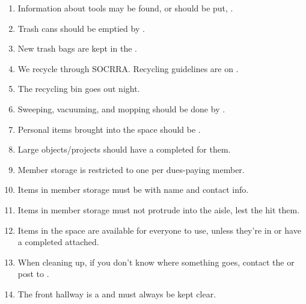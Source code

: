\documentclass[10pt,letterpaper]{article}
\begin{document}
\begin{Form}
\begin{enumerate}
            \item Information about tools may be found, or should be put, \TextField[name=D1,width=2.5cm,bordercolor=black]{\mbox{}} \TextField[name=D2,width=2.5cm,bordercolor=black]{\mbox{}} \TextField[name=D3,width=2.5cm,bordercolor=black]{\mbox{}}.
            \item Trash cans should be emptied by \TextField[name=E1,width=2.5cm,bordercolor=black]{\mbox{}}.
            \item New trash bags are kept in the \TextField[name=F1,width=2.5cm,bordercolor=black]{\mbox{}} \TextField[name=F2,width=2.5cm,bordercolor=black]{\mbox{}}.
            \item We recycle through SOCRRA. Recycling guidelines are on \TextField[name=G1,width=2.5cm,bordercolor=black]{\mbox{}}.
            \item The recycling bin goes out \TextField[name=H1,width=2.5cm,bordercolor=black]{\mbox{}} night.
            \item Sweeping, vacuuming, and mopping should be done by \TextField[name=I1,width=2.5cm,bordercolor=black]{\mbox{}}.
            \item Personal items brought into the space should be \TextField[name=J1,width=2.5cm,bordercolor=black]{\mbox{}}.
            \item Large objects/projects should have a \TextField[name=K1,width=2.5cm,bordercolor=black]{\mbox{}} completed for them.
            \item Member storage is restricted to one \TextField[name=L1,width=2.5cm,bordercolor=black]{\mbox{}} per dues-paying member.
            \item Items in member storage must be \TextField[name=M1,width=2.5cm,bordercolor=black]{\mbox{}} with name and contact info.
            \item Items in member storage must not protrude into the aisle, lest the \TextField[name=N1,width=2.5cm,bordercolor=black]{\mbox{}} hit them.
            \item Items in the space are available for everyone to use, unless they're in \TextField[name=O1,width=2.5cm,bordercolor=black]{\mbox{}} \TextField[name=O2,width=2.5cm,bordercolor=black]{\mbox{}} or have a completed \TextField[name=O3,width=2.5cm,bordercolor=black]{\mbox{}} \TextField[name=O4,width=2.5cm,bordercolor=black]{\mbox{}} attached.
            \item When cleaning up, if you don't know where something goes, contact the \TextField[name=P1,width=2.5cm,bordercolor=black]{\mbox{}} \TextField[name=P2,width=2.5cm,bordercolor=black]{\mbox{}} or post to \TextField[name=P3,width=2.5cm,bordercolor=black]{\mbox{}}.
            \item The front hallway is a \TextField[name=Q1,width=2.5cm,bordercolor=black]{\mbox{}} \TextField[name=Q2,width=2.5cm,bordercolor=black]{\mbox{}} and must always be kept clear.
        \end{enumerate}
    \end{Form}
\end{document}
